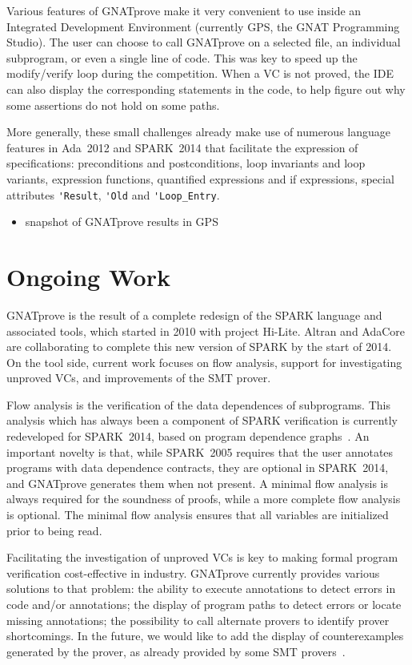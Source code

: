 \documentclass[sttt,draft]{svjour}
\newcommand{\hilite}{Hi-Lite}
\newcommand{\gnatprove}{GNATprove\xspace}
\newcommand{\oldspark}{SPARK~2005\xspace}
\newcommand{\newspark}{SPARK~2014\xspace}
\newcommand{\adatwtw}{Ada~2012\xspace}
\begin{document}
Various features of \gnatprove make it very convenient to use inside an
Integrated Development Environment (currently GPS, the GNAT Programming
Studio). The user can choose to call \gnatprove on a selected file, an
individual subprogram, or even a single line of code. This was key to speed up
the modify/verify loop during the competition. When a VC is not proved, the IDE
can also display the corresponding statements in the code, to help figure out
why some assertions do not hold on some paths.

More generally, these small challenges already make use of numerous language
features in \adatwtw and \newspark that facilitate the expression of
specifications: preconditions and postconditions, loop invariants and loop
variants, expression functions, quantified expressions and if expressions,
special attributes \verb|'Result|, \verb|'Old| and \verb|'Loop_Entry|.

\begin{itemize}
\item snapshot of GNATprove results in GPS
\end{itemize}

\section{Ongoing Work}
\label{ongoing}

\gnatprove is the result of a complete redesign of the SPARK language and
associated tools, which started in 2010 with project \hilite \cite{Hi-Lite}.
Altran and AdaCore are collaborating to complete this new version of SPARK by
the start of 2014. On the tool side, current work focuses on flow analysis,
support for investigating unproved VCs, and improvements of the SMT prover.

Flow analysis is the verification of the data dependences of subprograms. This
analysis which has always been a component of SPARK verification is currently
redeveloped for \newspark, based on program dependence
graphs~\cite{horwitz:1988:pldi}. An important novelty is that, while \oldspark
requires that the user annotates programs with data dependence contracts, they
are optional in \newspark, and \gnatprove generates them when not present. A
minimal flow analysis is always required for the soundness of proofs, while a
more complete flow analysis is optional. The minimal flow analysis ensures that
all variables are initialized prior to being read.

Facilitating the investigation of unproved VCs is key to making formal program
verification cost-effective in industry. \gnatprove currently provides various
solutions to that problem: the ability to execute annotations to detect errors
in code and/or annotations; the display of program paths to detect errors or
locate missing annotations; the possibility to call alternate provers to
identify prover shortcomings. In the future, we would like to add the display
of counterexamples generated by the prover, as already provided by some SMT
provers~\cite{CVC3,Z3model}.
\end{document}

